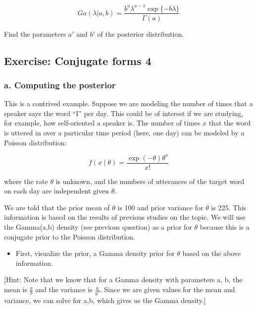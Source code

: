 \documentclass[12pt,]{krantz}
\providecommand{\tightlist}{%
  \setlength{\itemsep}{0pt}\setlength{\parskip}{0pt}}
\theoremstyle{definition}
\theoremstyle{definition}
\theoremstyle{definition}
\theoremstyle{remark}
\begin{document}
\begin{equation}
Ga(\lambda | a,b)=\frac{b^a \lambda^{a-1} \exp\{-b\lambda\}}{\Gamma(a)}
\end{equation}

Find the parameters \(a'\) and \(b'\) of the posterior distribution.

\subsection{Exercise: Conjugate forms
4}\label{exercise-conjugate-forms-4}

\subsubsection{a. Computing the
posterior}\label{a.-computing-the-posterior}

This is a contrived example. Suppose we are modeling the number of times
that a speaker says the word ``I'' per day. This could be of interest if
we are studying, for example, how self-oriented a speaker is. The number
of times \(x\) that the word is uttered in over a particular time period
(here, one day) can be modeled by a Poisson distribution:

\begin{equation}
f(x\mid \theta) = \frac{\exp(-\theta) \theta^x}{x!}
\end{equation}

where the rate \(\theta\) is unknown, and the numbers of utterances of
the target word on each day are independent given \(\theta\).

We are told that the prior mean of \(\theta\) is 100 and prior variance
for \(\theta\) is 225. This information is based on the results of
previous studies on the topic. We will use the Gamma(a,b) density (see
previous question) as a prior for \(\theta\) because this is a conjugate
prior to the Poisson distribution.

\begin{itemize}
\tightlist
\item
  First, visualize the prior, a Gamma density prior for \(\theta\) based
  on the above information.
\end{itemize}

{[}Hint: Note that we know that for a Gamma density with parameters a,
b, the mean is \(\frac{a}{b}\) and the variance is \(\frac{a}{b^2}\).
Since we are given values for the mean and variance, we can solve for
a,b, which gives us the Gamma density.{]}
\end{document}
